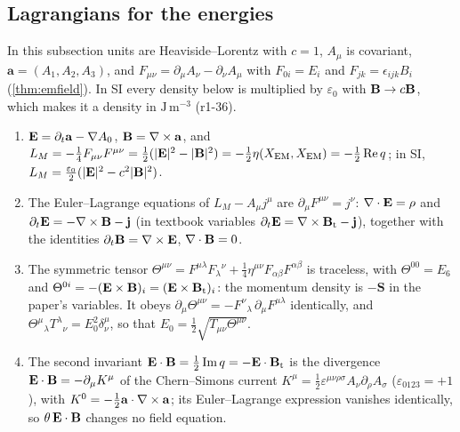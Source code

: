 \subsection{Lagrangians for the energies}
\label{r1:sec:energies}

In this subsection units are Heaviside--Lorentz with $c=1$, $A_\mu$ is covariant, $\mathbf a=(A_1,A_2,A_3)$, and
$F_{\mu\nu}=\partial_\mu A_\nu-\partial_\nu A_\mu$ with $F_{0i}=E_i$ and $F_{jk}=\epsilon_{ijk}B_i$ (\cref{thm:emfield}). In SI
every density below is multiplied by $\varepsilon_0$ with $\mathbf B\to c\mathbf B$, which makes it a density in $\mathrm{J\,m^{-3}}$ (r1-36).

\begin{proposition}
\label{r1:prop:maxwell}
\begin{enumerate}[label=(\roman*),leftmargin=2.2em]
\item $\mathbf E=\partial_t\mathbf a-\nabla A_0$, $\mathbf B=\nabla\times\mathbf a$, and
$L_M=-\tfrac14F_{\mu\nu}F^{\mu\nu}=\tfrac12(|\mathbf E|^2-|\mathbf B|^2)=-\tfrac12\eta(X_{\rm EM},X_{\rm EM})=-\tfrac12\operatorname{Re} q$; in SI,
$L_M=\tfrac{\varepsilon_0}2(|\mathbf E|^2-c^2|\mathbf B|^2)$.
\item The Euler--Lagrange equations of $L_M-A_\mu j^\mu$ are $\partial_\mu F^{\mu\nu}=j^\nu$: $\nabla\cdot\mathbf E=\rho$ and
$\partial_t\mathbf E=-\nabla\times\mathbf B-\mathbf j$ (in textbook variables $\partial_t\mathbf E=\nabla\times\mathbf B_{\rm t}-\mathbf j$), together with the identities $\partial_t\mathbf B=\nabla\times\mathbf E$,
$\nabla\cdot\mathbf B=0$.
\item The symmetric tensor $\Theta^{\mu\nu}=F^{\mu\lambda}F_\lambda{}^\nu+\tfrac14\eta^{\mu\nu}F_{\alpha\beta}F^{\alpha\beta}$ is traceless, with
$\Theta^{00}=E_6$ and $\Theta^{0i}=-(\mathbf E\times\mathbf B)_i=(\mathbf E\times\mathbf B_{\rm t})_i$: the momentum density is $-\mathbf S$ in the paper's variables. It obeys
$\partial_\mu \Theta^{\mu\nu}=-F^\nu{}_\lambda\,\partial_\mu F^{\mu\lambda}$ identically, and $\Theta^\mu{}_\lambda T^\lambda{}_\nu=E_0^2\delta^\mu_\nu$,
so that $E_0=\tfrac12\sqrt{T_{\mu\nu}\Theta^{\mu\nu}}$.
\item The second invariant $\mathbf E\cdot\mathbf B=\tfrac12\operatorname{Im} q=-\mathbf E\cdot\mathbf B_{\rm t}$ is the divergence $\mathbf E\cdot\mathbf B=-\partial_\mu K^\mu$ of the
Chern--Simons current $K^\mu=\tfrac12\varepsilon^{\mu\nu\rho\sigma}A_\nu\partial_\rho A_\sigma$ ($\varepsilon_{0123}=+1$), with
$K^0=-\tfrac12\mathbf a\cdot\nabla\times\mathbf a$; its Euler--Lagrange expression vanishes identically, so $\theta\,\mathbf E\cdot\mathbf B$ changes no field
equation.
\end{enumerate}
\end{proposition}

